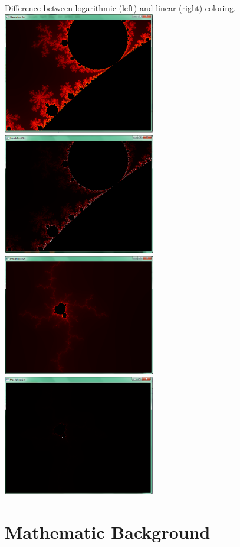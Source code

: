 \documentclass[final, paper=a4, paper=portrait, pagesize=auto, fontsize=10pt,english]{scrartcl}
\begin{document}
Difference between logarithmic (left) and linear (right) coloring. \\
\includegraphics[width=0.5\textwidth]{screenie2}
\includegraphics[width=0.5\textwidth]{screenie4}
\includegraphics[width=0.5\textwidth]{screenie7}
\includegraphics[width=0.5\textwidth]{screenie8}



\section{Mathematic Background}
\end{document}
